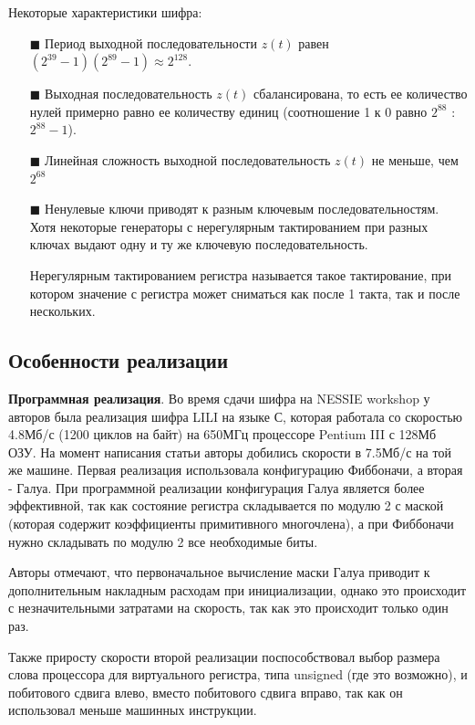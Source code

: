 \documentclass[colorthm]{./civarticle}
\begin{document}
Некоторые характеристики шифра:

\begin{itemize}
  \item[$\blacksquare$] Период выходной последовательности $z(t)$ равен $(2^{39}-1)(2^{89}-1) \approx 2^{128}$.
  \item[$\blacksquare$] Выходная последовательность $z(t)$ сбалансирована, то есть ее количество нулей  примерно равно ее количеству единиц (соотношение 1 к 0 равно $2^{88}$ : $2^{88}-1$).
  \item[$\blacksquare$] Линейная сложность выходной последовательность $z(t)$ не меньше, чем $2^{68}$
  \item[$\blacksquare$] Ненулевые ключи приводят к разным ключевым последовательностям. Хотя некоторые генераторы с нерегулярным тактированием при разных ключах выдают одну и ту же ключевую последовательность.
  \begin{remark}
    Нерегулярным тактированием регистра называется такое тактирование, при котором значение с регистра может сниматься как после 1 такта, так и после нескольких.
  \end{remark}
\end{itemize}

\subsection{Особенности реализации}

\textbf{Программная реализация}. Во время сдачи шифра на NESSIE workshop у авторов была реализация шифра LILI на языке С, которая работала со скоростью 4.8Мб/с (1200 циклов на байт) на 650МГц процессоре Pentium III с 128Мб ОЗУ. На момент написания статьи авторы добились скорости в 7.5Мб/с на той же машине. Первая реализация использовала конфигурацию Фиббоначи, а вторая - Галуа. При программной реализации конфигурация Галуа является более эффективной, так как состояние регистра складывается по модулю 2 с маской (которая содержит коэффициенты примитивного многочлена), а при Фиббоначи нужно складывать по модулю 2 все необходимые биты.

Авторы отмечают, что первоначальное вычисление маски Галуа приводит к дополнительным накладным расходам при инициализации, однако это происходит с незначительными затратами на скорость, так как это происходит только один раз.

Также приросту скорости второй реализации поспособствовал выбор размера слова процессора для виртуального регистра, типа unsigned (где это возможно), и побитового сдвига влево, вместо побитового сдвига вправо, так как он использовал меньше машинных инструкции.
\end{document}
